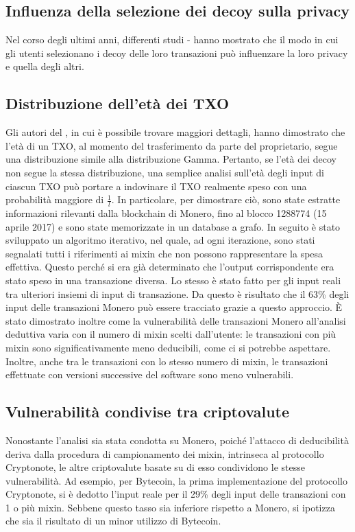 \subsection{Influenza della selezione dei decoy sulla privacy}
Nel corso degli ultimi anni, differenti studi \cite{ref4}-\cite{ref5} hanno mostrato che il modo in cui gli utenti selezionano i decoy delle loro transazioni può influenzare la loro privacy e quella degli altri.

\subsection{Distribuzione dell'età dei TXO}
Gli autori del \cite{ref4}, in cui è possibile trovare maggiori dettagli, hanno dimostrato che l'età di un TXO, al momento del trasferimento da parte del proprietario, segue una distribuzione simile alla distribuzione Gamma. Pertanto, se l'età dei decoy non segue la stessa distribuzione, una semplice analisi sull'età degli input di ciascun TXO può portare a indovinare il TXO realmente speso con una probabilità maggiore di $\frac{1}{l}$. In particolare, per dimostrare ciò, sono state estratte informazioni rilevanti dalla blockchain di Monero, fino al blocco 1288774 (15 aprile 2017) e sono state memorizzate in un database a grafo. In seguito è stato sviluppato un algoritmo iterativo, nel quale, ad ogni iterazione, sono stati segnalati tutti i riferimenti ai mixin che non possono rappresentare la spesa effettiva. Questo perché si era già determinato che l'output corrispondente era stato speso in una transazione diversa. Lo stesso è stato fatto per gli input reali tra ulteriori insiemi di input di transazione. Da questo è risultato che il 63\% degli input delle transazioni Monero può essere tracciato grazie a questo approccio. È stato dimostrato inoltre come la vulnerabilità delle transazioni Monero all'analisi deduttiva varia con il numero di mixin scelti dall'utente: le transazioni con più mixin sono significativamente meno deducibili, come ci si potrebbe aspettare. Inoltre, anche tra le transazioni con lo stesso numero di mixin, le transazioni effettuate con versioni successive del software sono meno vulnerabili.

\subsection{Vulnerabilità condivise tra criptovalute}
Nonostante l'analisi sia stata condotta su Monero, poiché l'attacco di deducibilità deriva dalla procedura di campionamento dei mixin, intrinseca al protocollo Cryptonote, le altre criptovalute basate su di esso condividono le stesse vulnerabilità. Ad esempio, per Bytecoin, la prima implementazione del protocollo Cryptonote, si è dedotto l'input reale per il 29\% degli input delle transazioni con 1 o più mixin. Sebbene questo tasso sia inferiore rispetto a Monero, si ipotizza che sia il risultato di un minor utilizzo di Bytecoin.

